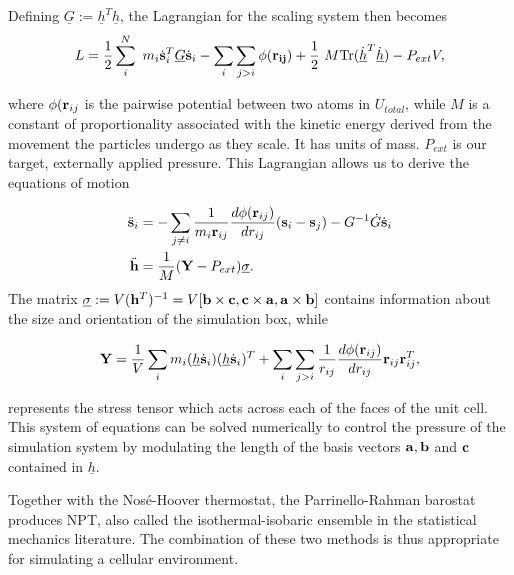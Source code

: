 Defining $\underline{G} := \underline{h}^T\underline{h}$, the Lagrangian for the scaling system then becomes
\begin{equation}
\begin{aligned}
	L = \frac{1}{2} \sum_i^N \  m_i \dot{\bold{s}}_i^T\underline{G}\dot{\bold{s}}_i - \sum_i \sum_{j > i } \phi (\bold{r_{ij}}) + \frac{1}{2} \ M \text{Tr}(\dot{\underline{h}}^T\dot{\underline{h}})   - {P}_{ext} V,
\end{aligned}
\end{equation}

where $\phi(\bold{r}_{ij}$ is the pairwise potential between two atoms in $U_{total}$, while $M$ is a constant of proportionality associated with the kinetic energy derived from the movement the particles undergo as they scale. It has units of mass. $P_{ext}$ is our target, externally applied pressure. This Lagrangian allows us to derive the equations of motion  

\begin{equation}
\begin{aligned}
	\ddot{\bold{s}}_i &= -\sum_{j\neq i}   \frac{1}{m_i\bold{r}_{ij} }\frac{d\phi(\bold{r}_{ij})}{d r_{ij}}  (\bold{s}_i - \bold{s}_j) - G^{-1}\dot{G} \dot{\bold{s}}_i \\
	\ddot{\bold{h}} &= \frac{1}{M} (\bold{Y} -P_{ext}) \underline{\sigma}.
\end{aligned}
\end{equation}
The matrix $\underline{\sigma} := V (\bold{h}^T)^{-1} = V  [\bold{b} \times \bold{c}, \bold{c} \times \bold{a}, \bold{a} \times \bold{b}] $  contains information about the size and orientation of the simulation box, while 

\begin{equation}
\begin{aligned}
	\bold{Y} = \frac{1}{V}\sum_i m_i (\underline{h}\dot{\bold{s}}_i) (\underline{h}\dot{\bold{s}}_i)^T + \sum_i \sum_{j>i}\frac{1}{{r}_{ij}} \frac{d \phi (\bold{r}_{ij})}{dr_{ij}} \bold{r}_{ij}\bold{r}_{ij}^T,
\end{aligned}
\end{equation}

represents the stress tensor which acts across each of the faces of the unit cell. 
This system of equations can be solved numerically to control the pressure of the simulation system by modulating the length of the basis vectors $\bold{a}, \bold{b}$ and $\bold{c}$ contained in $\underline{h}$.

	Together with the Nos\'e-Hoover thermostat, the Parrinello-Rahman barostat produces NPT, also called the isothermal-isobaric ensemble in the statistical mechanics literature. The combination of these two methods is thus appropriate for simulating a cellular environment. 


